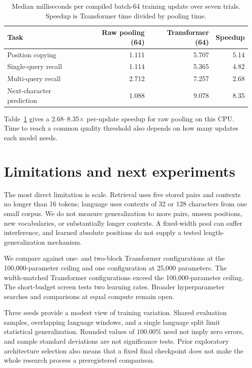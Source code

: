 \documentclass[11pt]{article}
\begin{document}
\begin{table}[htbp]
\centering\small
\caption{Median milliseconds per compiled batch-64 training update over seven trials. Speedup is Transformer time divided by pooling time.}
\label{tab:raw-training-speed}
\begin{tabular}{lrrr}
\toprule
Task & Raw pooling (64) & Transformer (64) & Speedup\\
\midrule
Position copying & 1.111 & 5.707 & 5.14\\
Single-query recall & 1.114 & 5.365 & 4.82\\
Multi-query recall & 2.712 & 7.257 & 2.68\\
Next-character prediction & 1.088 & 9.078 & 8.35\\
\bottomrule
\end{tabular}
\end{table}

Table~\ref{tab:raw-training-speed} gives a 2.68--8.35$\times$ per-update speedup for raw pooling on this CPU. Time to reach a common quality threshold also depends on how many updates each model needs.

\section{Limitations and next experiments}
The most direct limitation is scale. Retrieval uses five stored pairs and contexts no longer than 16 tokens; language uses contexts of 32 or 128 characters from one small corpus. We do not measure generalization to more pairs, unseen positions, new vocabularies, or substantially longer contexts. A fixed-width pool can suffer interference, and learned absolute positions do not supply a tested length-generalization mechanism.

We compare against one- and two-block Transformer configurations at the 100,000-parameter ceiling and one configuration at 25,000 parameters. The width-matched Transformer configurations exceed the 100,000-parameter ceiling. The short-budget screen tests two learning rates. Broader hyperparameter searches and comparisons at equal compute remain open.

Three seeds provide a modest view of training variation. Shared evaluation samples, overlapping language windows, and a single language split limit statistical generalization. Rounded values of $100.00\%$ need not imply zero errors, and sample standard deviations are not significance tests. Prior exploratory architecture selection also means that a fixed final checkpoint does not make the whole research process a preregistered comparison.
\end{document}
